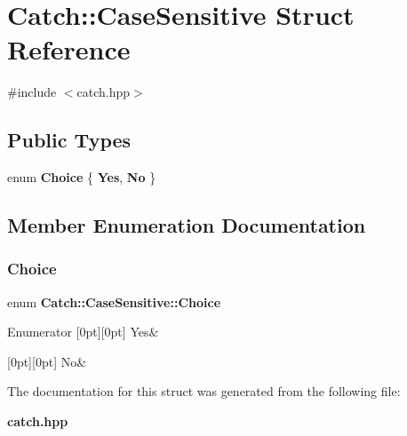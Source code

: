 \section{Catch\+:\+:Case\+Sensitive Struct Reference}
\label{struct_catch_1_1_case_sensitive}


{\ttfamily \#include $<$catch.\+hpp$>$}

\subsection*{Public Types}
\begin{DoxyCompactItemize}
\item 
enum \textbf{ Choice} \{ \textbf{ Yes}, 
\textbf{ No}
 \}
\end{DoxyCompactItemize}


\subsection{Member Enumeration Documentation}
\mbox{\label{struct_catch_1_1_case_sensitive_aad49d3aee2d97066642fffa919685c6a}} 
\subsubsection{Choice}
{\footnotesize\ttfamily enum \textbf{ Catch\+::\+Case\+Sensitive\+::\+Choice}}

\begin{DoxyEnumFields}{Enumerator}
[0pt][0pt]{}\mbox{\label{struct_catch_1_1_case_sensitive_aad49d3aee2d97066642fffa919685c6aa7c5550b69ec3c502e6f609b67f9613c6}} 
Yes&\\
\hline

[0pt][0pt]{}\mbox{\label{struct_catch_1_1_case_sensitive_aad49d3aee2d97066642fffa919685c6aa4ffff8d29b481f0116abc37228cd53f6}} 
No&\\
\hline

\end{DoxyEnumFields}


The documentation for this struct was generated from the following file\+:\begin{DoxyCompactItemize}
\item 
\textbf{ catch.\+hpp}\end{DoxyCompactItemize}

